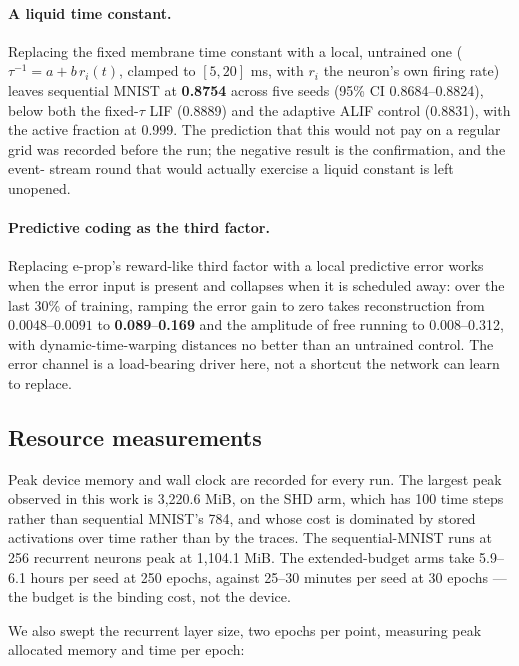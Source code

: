 \documentclass[11pt]{article}
\begin{document}
\paragraph{A liquid time constant.} Replacing the fixed membrane time constant
with a local, untrained one ($\tau^{-1} = a + b\,r_i(t)$, clamped to
$[5, 20]$ ms, with $r_i$ the neuron's own firing rate) leaves sequential MNIST
at \textbf{0.8754} across five seeds (95\% CI 0.8684--0.8824), below both the
fixed-$\tau$ LIF (0.8889) and the adaptive ALIF control (0.8831), with the active
fraction at 0.999. The prediction that this would not pay on a regular grid was
recorded before the run; the negative result is the confirmation, and the event-
stream round that would actually exercise a liquid constant is left unopened.

\paragraph{Predictive coding as the third factor.} Replacing e-prop's
reward-like third factor with a local predictive error works when the error
input is present and collapses when it is scheduled away: over the last 30\% of
training, ramping the error gain to zero takes reconstruction from
$0.0048$--$0.0091$ to \textbf{0.089}--\textbf{0.169} and the amplitude of free
running to 0.008--0.312, with dynamic-time-warping distances no better than an
untrained control. The error channel is a load-bearing driver here, not a
shortcut the network can learn to replace.

\subsection{Resource measurements}
Peak device memory and wall clock are recorded for every run. The largest peak
observed in this work is 3{,}220.6 MiB, on the SHD arm, which has 100 time steps
rather than sequential MNIST's 784, and whose cost is dominated by stored
activations over time rather than by the traces. The sequential-MNIST runs at
256 recurrent neurons peak at 1{,}104.1 MiB. The extended-budget arms take
5.9--6.1 hours per seed at 250 epochs, against 25--30 minutes per seed at 30
epochs --- the budget is the binding cost, not the device.

We also swept the recurrent layer size, two epochs per point, measuring peak
allocated memory and time per epoch:
\end{document}
